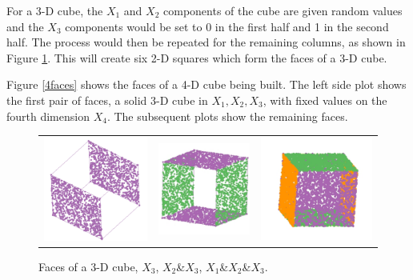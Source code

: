 \documentclass[a4paper]{report}
\begin{document}
\begin{article}
For a 3-D cube, the $X_1$ and $X_2$ components of the cube are given
random values and the $X_3$ components would be set to 0 in the first
half and 1 in the second half. The process would then be repeated for
the remaining columns, as shown in Figure \ref{faces}. This will
create six 2-D squares which form the faces of a 3-D cube.

Figure \ref{4faces} shows the faces of a 4-D cube being built. The
left side plot shows the first pair of faces, a solid 3-D cube in
$X_1, X_2, X_3$, with fixed values on the fourth dimension $X_4$. The
subsequent plots show the remaining faces.

\begin{figure}[ht]
  \centering
  \begin{tabular}{c c c}
    \includegraphics[width=.9in]{cube-x.pdf} &
    \includegraphics[width=.9in]{cube-x-y.pdf} &
    \includegraphics[width=.9in]{cube-x-y-z.pdf} 
  \end{tabular}

  \caption{Faces of a 3-D cube, $X_3$, $X_2$\&$X_3$,
      $X_1$\&$X_2$\&$X_3$.}
  \label{faces}
\end{figure}


\end{article}
\end{document}
